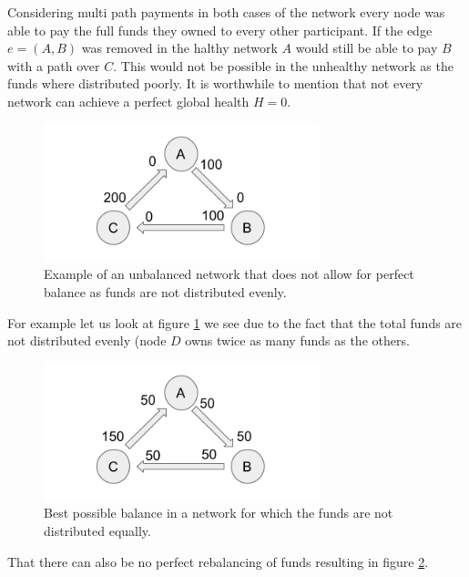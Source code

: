 \documentclass[a4paper]{paper}
\begin{document}
Considering multi path payments in both cases of the network every node was able to pay the full funds they owned to every other participant.
If the edge $e=(A,B)$ was removed in the halthy network $A$ would still be able to pay $B$ with a path over $C$.
This would not be possible in the unhealthy network as the funds where distributed poorly.
It is worthwhile to mention that not every network can achieve a perfect global health $H=0$.
\begin{figure}
 \centering
 \includegraphics[width=8cm]{img/oddUnbalanced.png}
 \caption{Example of an unbalanced network that does not allow for perfect balance as funds are not distributed evenly.}
 \label{fig:oddUnbalanced}
\end{figure}
For example let us look at figure \ref{fig:oddUnbalanced} we see due to the fact that the total funds are not distributed evenly (node $D$ owns twice as many funds as the others.

\begin{figure}
 \centering
 \includegraphics[width=8cm]{img/oddBalanced.png}
 \caption{Best possible balance in a network for which the funds are not distributed equally.}
 \label{fig:oddBalanced}
\end{figure}
That there can also be no perfect rebalancing of funds resulting in figure \ref{fig:oddBalanced}.
\end{document}
